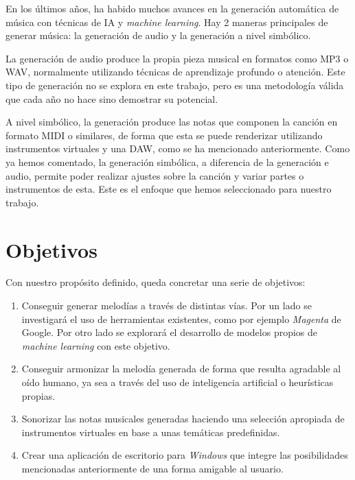 En los últimos años, ha habido muchos avances en la generación automática de música con técnicas de IA y \textit{machine learning}. Hay 2 maneras principales de generar música: la generación de audio y la generación a nivel simbólico. 

La generación de audio produce la propia pieza musical en formatos como MP3 o WAV, normalmente utilizando técnicas de aprendizaje profundo o atención. Este tipo de generación no se explora en este trabajo, pero es una metodología válida que cada año no hace sino demostrar su potencial.

A nivel simbólico, la generación produce las notas que componen la canción en formato MIDI o similares, de forma que esta se puede renderizar utilizando instrumentos virtuales y una DAW, como se ha mencionado anteriormente. Como ya hemos comentado, la generación simbólica, a diferencia de la generación e audio, permite poder realizar ajustes sobre la canción y variar partes o instrumentos de esta. Este es el enfoque que hemos seleccionado para nuestro trabajo.


\section{Objetivos}
Con nuestro propósito definido, queda concretar una serie de objetivos:
\begin{enumerate}
    \item Conseguir generar melodías a través de distintas vías. Por un lado se investigará el uso de herramientas existentes, como por ejemplo \textit{Magenta} de Google. Por otro lado se explorará el desarrollo de modelos propios de \textit{machine learning} con este objetivo.
    \item Conseguir armonizar la melodía generada de forma que resulta agradable al oído humano, ya sea a través del uso de inteligencia artificial o heurísticas propias.
    \item Sonorizar las notas musicales generadas haciendo una selección apropiada de instrumentos virtuales en base a unas temáticas predefinidas.
    \item Crear una aplicación de escritorio para \textit{Windows} que integre las posibilidades mencionadas anteriormente de una forma amigable al usuario.
\end{enumerate}

